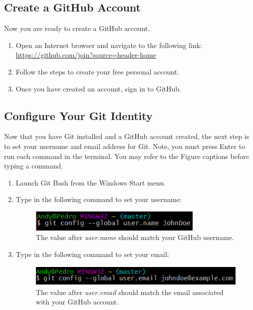 \documentclass[12pt]{article}
\begin{document}
\subsection{Create a GitHub Account}
Now you are ready to create a GitHub account.
\begin{enumerate}
    \item Open an Internet browser and navigate to the following link: \\
        \href{https://github.com/join?source=header-home}{https://github.com/join?source=header-home}
    \item Follow the steps to create your free personal account.
    \item Once you have created an account, sign in to GitHub.
\end{enumerate}

\subsection{Configure Your Git Identity}
Now that you have Git installed and a GitHub account created, the next step is to set your username and email address for Git. Note, you must press Enter to run each command in the terminal. You may refer to the Figure captions before typing a command.
\begin{enumerate}
    \item Launch Git Bash from the Windows Start menu.
    \item Type in the following command to set your username:
    \begin{figure}[h!]
        \includegraphics[height=1cm, center]{Git-Config-Name}
        \caption{The value after \emph{user.name} should match your GitHub username.}
    \end{figure}
    \item Type in the following command to set your email:
    \begin{figure}[h!]
        \includegraphics[height=1cm, center]{Git-Config-Email}
        \caption{The value after \emph{user.email} should match the email associated with your GitHub account.}
    \end{figure}
\end{enumerate}
\end{document}
